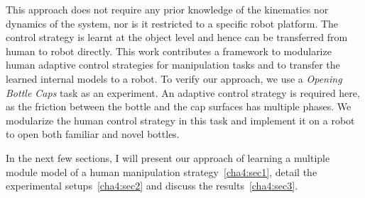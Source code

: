 This approach does not require any prior knowledge of the kinematics nor dynamics of the system, nor is it restricted to a specific robot platform. The control strategy is learnt at the object level and hence can be transferred from human to robot directly.
This work contributes a framework to modularize human adaptive control strategies for manipulation tasks and to transfer the learned internal models to a robot. To verify our approach, we use a \emph{Opening Bottle Caps} task as an experiment. An adaptive control strategy is required here, as the friction between the bottle and the cap surfaces has multiple phases. We modularize the human control strategy in this task and implement it on a robot to open both familiar and novel bottles.

In the next few sections, I will present our approach of learning a multiple module model of a human manipulation strategy~\ref{cha4:sec1}, detail the experimental setups~\ref{cha4:sec2} and discuss the results~\ref{cha4:sec3}.




